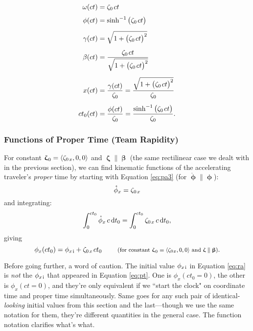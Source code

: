 \documentclass[12pt]{article}
\newcommand{\dd}[1]{\mathrm{d}#1}
\newcommand{\vvbeta}{\bm{\upbeta}}
\newcommand{\vvphi}{\bm{\upphi}}
\newcommand{\vvzeta}{\bm{\upzeta}}
\begin{document}
\begin{equation*}
\begin{aligned}
\omega (ct) &= \zeta_0 \mkern2mu ct \\[3pt]
\phi (ct) &= \sinh^{-1} \big( \zeta_0 \mkern2mu ct \big) \\[5pt]
\gamma (ct) &= \sqrt{1 + \big( \zeta_0 \mkern2mu ct \big)^2} \\[5pt]
\beta (ct) &= \dfrac{\zeta_0 \mkern2mu ct}{\sqrt{1 + \big( \zeta_0 \mkern2mu ct \big)^2}} \\[5pt]
x (ct) &= \dfrac{ \gamma (ct) }{ \zeta_0} = \dfrac{\sqrt{1 + \big( \zeta_0 \mkern2mu ct \big)^2}}{ \zeta_0} \\[5pt]
ct_0 (ct) &= \dfrac{ \phi (ct) }{ \zeta_0} = \dfrac{\sinh^{-1} \big( \zeta_0 \mkern2mu ct \big)}{ \zeta_0}.
\end{aligned}
\end{equation*}


\subsubsection{Functions of Proper Time (Team Rapidity)}

For constant $\vvzeta_{\mkern1mu 0} = \langle \zeta_{0 \mkern2mu x} , 0, 0 \rangle$ and $\vvzeta \parallel \vvbeta$ (the same rectilinear case we dealt with in the previous section), we can find kinematic functions of the accelerating traveler's \emph{proper} time by starting with Equation \ref{eq:pa3} (for $\mathring{\vvphi} \parallel \vvphi$):
\begin{equation*}
\mathring{\phi}_x = \zeta_{0 \mkern2mu x}
\end{equation*}
and integrating:
\begin{equation*}
\int_0^{ct_0} \mathring{\phi}_x \, c \, \dd t_0 = \int_0^{ct_0}  \zeta_{0 \mkern2mu x} \, c \, \dd t _0 ,
\end{equation*}
giving
\begin{equation}\label{eq:ra}
\phi_x (ct_0) = \phi_{x \mkern2mu \textrm{i} } + \zeta_{0 \mkern2mu x} \mkern2mu ct_0 \qquad \textrm{\footnotesize{ (for constant $\vvzeta_{\mkern1mu 0} = \langle \zeta_{0 \mkern1mu x} , 0, 0 \rangle$ and $\vvzeta \parallel \vvbeta$)}}.
\end{equation}

Before going further, a word of caution. The initial value $\phi_{x \mkern2mu \textrm{i} }$ in Equation \ref{eq:ra} is \emph{not} the $\phi_{x \mkern2mu \textrm{i} }$ that appeared in Equation \ref{eq:pt}. One is $\phi_x (ct_0 = 0)$, the other is $\phi_x (ct = 0)$, and they're only equivalent if we ``start the clock" on coordinate time and proper time simultaneously. Same goes for any such pair of identical-\emph{looking} initial values from this section and the last---though we use the same notation for them, they're different quantities in the general case. The function notation clarifies what's what.
\end{document}
